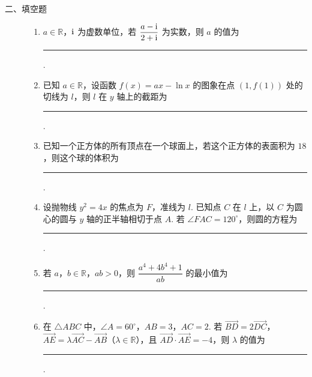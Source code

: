 \begin{description}

    \item[二、填空题]

    \begin{enumerate}[leftmargin=5pt]

      \addtocounter{enumi}{+8}

        \item \(a\in\mathbb{R}\)，\(\mathrm{i}\) 为虚数单位，若 \(\dfrac{a-\mathrm{i}}{2+\mathrm{i}}\) 为实数，则 \(a\) 的值为\rule[-0.3ex]{3em}{0.4pt}.

        \item 已知 \(a\in\mathbb{R}\)，设函数 \(f(x)=ax-\ln x\) 的图象在点 \((1,f(1))\) 处的切线为 \(l\)，则 \(l\) 在 \(y\) 轴上的截距为\rule[-0.3ex]{3em}{0.4pt}.

        \item 已知一个正方体的所有顶点在一个球面上，若这个正方体的表面积为 \(18\)，则这个球的体积为\rule[-0.3ex]{3em}{0.4pt}.

        \item 设抛物线 \(y^2=4x\) 的焦点为 \(F\)，准线为 \(l\). 已知点 \(C\) 在 \(l\) 上，以 \(C\) 为圆心的圆与 \(y\) 轴的正半轴相切于点 \(A\). 若 \(\angle FAC=120^\circ\)，则圆的方程为\rule[-0.3ex]{3em}{0.4pt}.

        \item 若 \(a\)，\(b\in\mathbb{R}\)，\(ab>0\)，则 \(\dfrac{a^4+4b^4+1}{ab}\) 的最小值为\rule[-0.3ex]{3em}{0.4pt}.

        \item 在 \(\triangle ABC\) 中，\(\angle A=60^\circ\)，\(AB=3\)，\(AC=2\). 若 \(\overrightarrow{BD}=2\overrightarrow{DC}\)，\(\overrightarrow{AE}=\lambda\overrightarrow{AC}-\overrightarrow{AB}\)（\(\lambda\in\mathbb{R}\)），且 \(\overrightarrow{AD}\cdot\overrightarrow{AE}=-4\)，则 \(\lambda\) 的值为\rule[-0.3ex]{3em}{0.4pt}.

    \end{enumerate}

\end{description}

